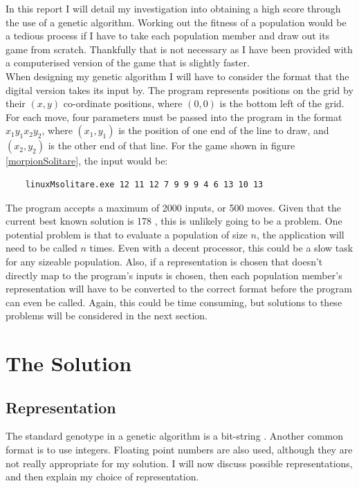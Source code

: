 \documentclass[]{report}
\begin{document}
In this report I will detail my investigation into obtaining a high score through the use of a genetic algorithm. Working out the fitness of a population would be a tedious process if I have to take each population member and draw out its game from scratch. Thankfully that is not necessary as I have been provided with a computerised version of the game that is slightly faster.\\

When designing my genetic algorithm I will have to consider the format that the digital version takes its input by. The program represents positions on the grid by their $(x, y)$ co-ordinate positions, where $(0, 0)$ is the bottom left of the grid. For each move, four parameters must be passed into the program in the format $x_1 y_1 x_2 y_2$, where $(x_1, y_1)$ is the position of one end of the line to draw, and $(x_2, y_2)$ is the other end of that line. For the game shown in figure \ref{morpionSolitare}, the input would be:

\begin{verbatim}
	linuxMsolitare.exe 12 11 12 7 9 9 9 4 6 13 10 13
\end{verbatim}

The program accepts a maximum of 2000 inputs, or 500 moves. Given that the current best known solution is 178 \cite{MorpionRecord}, this is unlikely going to be a problem. One potential problem is that to evaluate a population of size $n$, the application will need to be called $n$ times. Even with a decent processor, this could be a slow task for any sizeable population. Also, if a representation is chosen that doesn't directly map to the program's inputs is chosen, then each population member's representation will have to be converted to the correct format before the program can even be called. Again, this could be time consuming, but solutions to these problems will be considered in the next section.


\chapter{The Solution}

\section{Representation}

The standard genotype in a genetic algorithm is a bit-string \cite{ECIntro}. Another common format is to use integers. Floating point numbers are also used, although they are not really appropriate for my solution. I will now discuss possible representations, and then explain my choice of representation.
\end{document}
